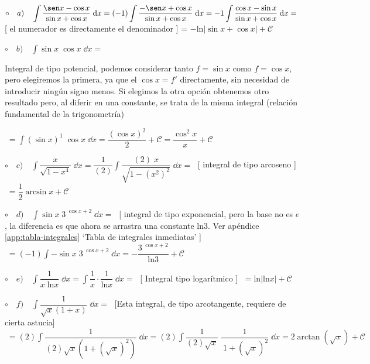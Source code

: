\begin{proofw}\renewcommand{\qedsymbol}{$\diamond$}	



	$\circ \quad a) \quad \displaystyle \int \dfrac {\sen x - \cos x}{\sin x + \cos x} \; \dd x = \displaystyle (-1)\int \dfrac {-\sen x +\cos x}{\sin x + \cos x} \; \dd x = \displaystyle -1\int \dfrac {\cos x - \sin x}{\sin x + \cos x} \; \dd x = \; $ \small{ [ el numerador es directamente el denominador ] } = \normalsize{$ - \mathrm{ln} \left| \sin x + \cos x \right| + \mathcal C$}
	
	
	$\circ \quad b) \quad \displaystyle \int \sin x \; \cos x  \; \dd x= \;$  
	
Integral de tipo potencial, podemos considerar tanto $f=\sin x$ como $f=\cos x$, pero elegiremos la primera, ya que el $\cos x = f'$ directamente, sin necesidad de introducir ningún signo menos. Si elegimos la otra opción obtenemos otro resultado pero, al  diferir en una constante, se trata de la misma integral (relación fundamental de la trigonometría) 

$\;= \displaystyle \int (\sin x)^1 \; \cos x  \; \dd x = \dfrac {(\cos x)^2}{2} + \mathcal C  = \dfrac {\cos^2 x}{x} + \mathcal C$
	
	$\circ \quad c) \quad \displaystyle \int \dfrac {x}{\sqrt{1-x^4}} \; \dd x= \displaystyle  \dfrac{1}{(2)} \int \dfrac {(2)\; x}{\sqrt{1-(x^2)^2}} \; \dd x= \; $ \small{[ integral de tipo arcoseno ]} \normalsize{ $\; = \dfrac 1 2 \arcsin x + \mathcal C $}
	
	$\circ \quad d) \quad \displaystyle \int \sin x \; 3^{\; \cos x + 2} \; \dd x= \; $ \small{[ integral de tipo exponencial, pero la base no es $e$, la diferencia es que ahora se arrastra una constante $\mathrm{ln}3$. Ver apéndice \ref{app:tabla-integrales} `Tabla de integrales inmediatas' ]} \normalsize{}$\; = \displaystyle(-1) \int -\sin x \; 3^{\; \cos x + 2} \; \dd x= - \dfrac {3^{\; \cos x + 2}}{\mathrm{ln}3} + \mathcal C$
	
	$\circ \quad e) \quad \displaystyle \int \dfrac {1}{x\; \mathrm{ln}x} \; \dd x= \int \dfrac {1}{x} \cdot \dfrac {1} {\mathrm{ln}x} \; \dd x =\; $ \small{[ Integral tipo logarítmico ]} \normalsize{ $\; = \mathrm {ln} |\mathrm {ln} x| + \mathcal C$}
	
	$\circ \quad f) \quad \displaystyle \int \dfrac {1}{\sqrt{x}(1+x)} \; \dd x = \; $ \small{[Esta integral, de tipo arcotangente, requiere de cierta astucia]}  \normalsize{$\; = \displaystyle (2) \int \dfrac {1}{(2) \sqrt{x} \left( 1+(\sqrt{x})^2 \right)} \; \dd x =(2) \int \dfrac {1}{(2) \sqrt{x}} \; \dfrac {1}{\ 1+(\sqrt{x})^2 } \; \dd x =2 \arctan (\sqrt{x})+\mathcal C$}
\end{proofw}

